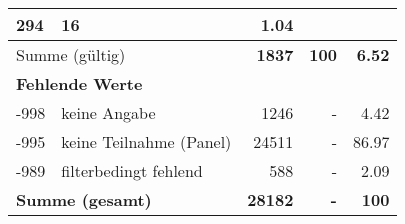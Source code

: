 \begin{longtable}{lXrrr}
       \num{294} &
       \num[round-mode=places,round-precision=2]{16} &
         \num[round-mode=places,round-precision=2]{1.04} \\
     \midrule
     \multicolumn{2}{l}{Summe (gültig)} &
       \textbf{\num{1837}} &
     \textbf{\num{100}} &
       \textbf{\num[round-mode=places,round-precision=2]{6.52}} \\
     \multicolumn{5}{l}{\textbf{Fehlende Werte}}\\
       -998 &
       keine Angabe &
         \num{1246} &
        - &
         \num[round-mode=places,round-precision=2]{4.42} \\
       -995 &
       keine Teilnahme (Panel) &
         \num{24511} &
        - &
         \num[round-mode=places,round-precision=2]{86.97} \\
       -989 &
       filterbedingt fehlend &
         \num{588} &
        - &
         \num[round-mode=places,round-precision=2]{2.09} \\
     \midrule
     \multicolumn{2}{l}{\textbf{Summe (gesamt)}} &
          \textbf{\num{28182}} &
        \textbf{-} &
        \textbf{\num{100}} \\
     \bottomrule
     \end{longtable}
     
